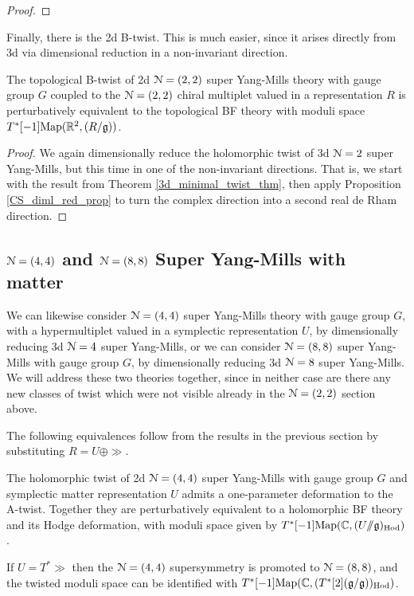 \documentclass[10pt, oneside]{article}
\newcommand{\ham}{/\!\!/}
\begin{document}
\begin{proof}
 
\end{proof}

Finally, there is the 2d B-twist.  This is much easier, since it arises directly from 3d via dimensional reduction in a non-invariant direction.
\begin{theorem} \label{2d_2_B_twist_thm}
The topological B-twist of 2d $\mathcal{N}=(2,2)$ super Yang-Mills theory with gauge group $G$ coupled to the $\mathcal{N}=(2,2)$ chiral multiplet valued in a representation $R$ is perturbatively equivalent to the topological BF theory with moduli space $T^*[-1]\mathrm{Map}(\mathbb R^2, (R/\mathfrak{g}))$.
\end{theorem}

\begin{proof}
We again dimensionally reduce the holomorphic twist of 3d $\mathcal{N}=2$ super Yang-Mills, but this time in one of the non-invariant directions.  That is, we start with the result from Theorem \ref{3d_minimal_twist_thm}, then apply Proposition \ref{CS_diml_red_prop} to turn the complex direction into a second real de Rham direction.
\end{proof}

\subsection{\texorpdfstring{$\mathcal N=(4,4)$}{N=(4,4)} and \texorpdfstring{$\mathcal N=(8,8)$}{N=(8,8)} Super Yang-Mills with matter} \label{sect:2d(4,4)}
We can likewise consider $\mathcal{N}=(4,4)$ super Yang-Mills theory with gauge group $G$, with a hypermultiplet valued in a symplectic representation $U$, by dimensionally reducing 3d $\mathcal{N}=4$ super Yang-Mills, or we can consider $\mathcal{N}=(8,8)$ super Yang-Mills with gauge group $G$, by dimensionally reducing 3d $\mathcal{N}=8$ super Yang-Mills.  We will address these two theories together, since in neither case are there any new classes of twist which were not visible already in the $\mathcal{N}=(2,2)$ section above.  

The following equivalences follow from the results in the previous section by substituting $R = U \oplus \gg$.

\begin{theorem}
The holomorphic twist of 2d $\mathcal{N}=(4,4)$ super Yang-Mills with gauge group $G$ and symplectic matter representation $U$ admits a one-parameter deformation to the A-twist.  Together they are perturbatively equivalent to a holomorphic BF theory and its Hodge deformation, with moduli space given by $T^*[-1]\mr{Map}(\CC, (U \ham \gg)_{\mr{Hod}})$.

If $U = T^*\gg$ then the $\mathcal{N}=(4,4)$ supersymmetry is promoted to $\mathcal{N}=(8,8)$, and the twisted moduli space can be identified with  $T^*[-1]\mathrm{Map}(\mathbb C, (T^*[2](\mathfrak{g} / \mathfrak{g}))_{\mathrm{Hod}})$.
\end{theorem}
\end{document}

